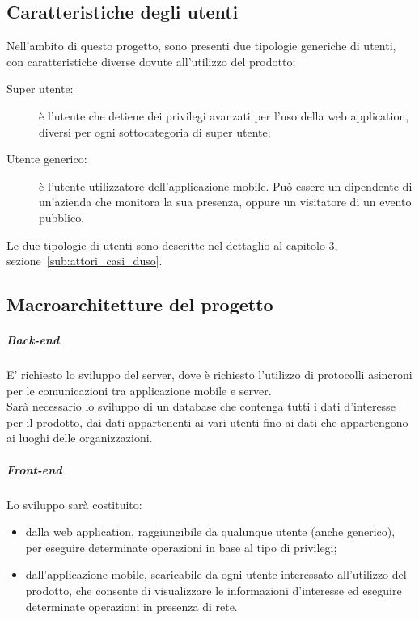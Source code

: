 \documentclass[../analisi-dei-requisiti.tex]{subfiles}
\begin{document}
\subsection{Caratteristiche degli utenti}%
\label{sub:caratteristiche_degli_utenti}
Nell'ambito di questo progetto, sono presenti due tipologie generiche di utenti, con caratteristiche diverse dovute all'utilizzo del prodotto:
\begin{description}
  \item[Super utente:] è l'utente che detiene dei privilegi avanzati per l'uso della web application, diversi per ogni sottocategoria di super utente;
  \item[Utente generico:] è l'utente utilizzatore dell'applicazione mobile. Può essere un dipendente di un'azienda che monitora la sua presenza, oppure
        un visitatore di un evento pubblico.
\end{description}
Le due tipologie di utenti sono descritte nel dettaglio al capitolo 3, sezione~\ref{sub:attori_casi_duso}.


\subsection{Macroarchitetture del progetto}%
\label{sub:macroarchitetture_del_progetto}
\subparagraph*{Back-end}%
\label{par:back-end}
E' richiesto lo sviluppo  del server, dove è richiesto l'utilizzo di protocolli asincroni per le comunicazioni tra applicazione mobile e server.\\
Sarà necessario lo sviluppo di un database che contenga tutti i dati d'interesse per il prodotto, dai dati appartenenti ai vari utenti fino ai dati che appartengono ai
luoghi delle organizzazioni.

\subparagraph*{Front-end}%
\label{par:front-end}
Lo sviluppo  sarà costituito:
\begin{itemize}
  \item dalla web application, raggiungibile da qualunque utente (anche generico), per eseguire determinate operazioni in base al tipo di privilegi;
  \item dall'applicazione mobile, scaricabile da ogni utente interessato all'utilizzo del prodotto, che consente di visualizzare le informazioni d'interesse ed eseguire determinate
        operazioni in presenza di rete.
\end{itemize}
\end{document}
